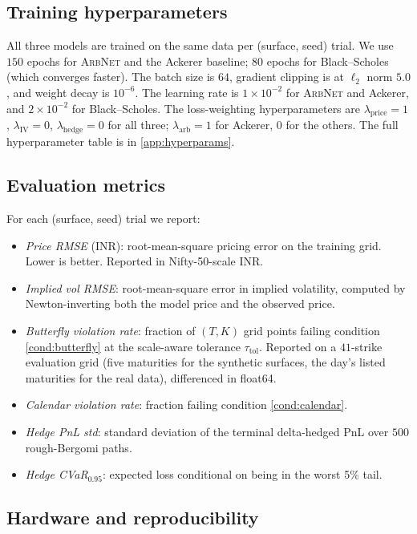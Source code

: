 \documentclass[largeformat]{interact}
\theoremstyle{plain}
\theoremstyle{definition}
\newcommand{\arbnet}{\textsc{ArbNet}}
\newcommand{\bs}{Black--Scholes}
\begin{document}
\subsection{Training hyperparameters}
\label{sec:hyperparams}

All three models are trained on the same data per (surface, seed) trial. We use $150$ epochs for \arbnet{} and the Ackerer baseline; $80$ epochs for \bs{} (which converges faster). The batch size is $64$, gradient clipping is at $\ell_2$ norm $5.0$, and weight decay is $10^{-6}$. The learning rate is $1\times10^{-2}$ for \arbnet{} and Ackerer, and $2\times10^{-2}$ for \bs{}. The loss-weighting hyperparameters are $\lambda_{\mathrm{price}} = 1$, $\lambda_{\mathrm{IV}} = 0$, $\lambda_{\mathrm{hedge}} = 0$ for all three; $\lambda_{\mathrm{arb}} = 1$ for Ackerer, $0$ for the others. The full hyperparameter table is in \cref{app:hyperparams}.

\subsection{Evaluation metrics}
\label{sec:metrics}

For each (surface, seed) trial we report:

\begin{itemize}[leftmargin=1.5em]
\item \emph{Price RMSE} (INR): root-mean-square pricing error on the training grid. Lower is better. Reported in Nifty-50-scale INR.
\item \emph{Implied vol RMSE}: root-mean-square error in implied volatility, computed by Newton-inverting both the model price and the observed price.
\item \emph{Butterfly violation rate}: fraction of $(T, K)$ grid points failing condition \ref{cond:butterfly} at the scale-aware tolerance $\tau_{\mathrm{tol}}$. Reported on a $41$-strike evaluation grid (five maturities for the synthetic surfaces, the day's listed maturities for the real data), differenced in float64.
\item \emph{Calendar violation rate}: fraction failing condition \ref{cond:calendar}.
\item \emph{Hedge PnL std}: standard deviation of the terminal delta-hedged PnL over $500$ rough-Bergomi paths.
\item \emph{Hedge CVaR$_{0.95}$}: expected loss conditional on being in the worst 5\% tail.
\end{itemize}

\subsection{Hardware and reproducibility}
\label{sec:hardware}
\end{document}
